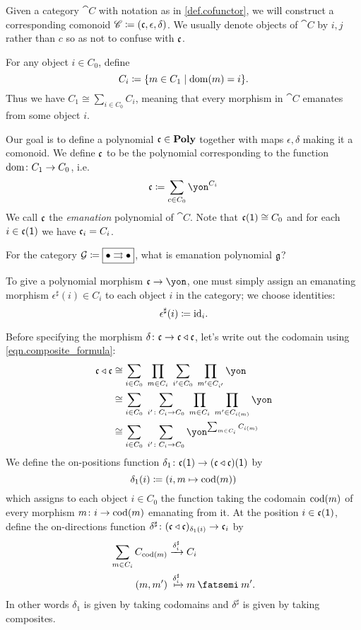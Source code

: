 \documentclass[DynamicalBook]{subfiles}
\begin{document}
Given a category $\cat{C}$ with notation as in \cref{def.cofunctor}, we will construct a corresponding comonoid $\mathscr{C}\coloneqq(\mathfrak{c},\epsilon,\delta)$. We usually denote objects of $\cat{C}$ by $i,j$ rather than $c$ so as not to confuse with $\mathfrak{c}$. 

For any object $i\in C_0$, define
\[C_i\coloneqq\{m\in C_1\mid\operatorname{dom}(m)=i\}.\]
Thus we have $C_1\cong\sum_{i\in C_0}C_i$, meaning that every morphism in $\cat{C}$ emanates from some object $i$.

Our goal is to define a polynomial $\mathfrak{c}\in\textbf{Poly}$ together with maps $\epsilon,\delta$ making it a comonoid. We define $\mathfrak{c}$ to be the polynomial corresponding to the function $\operatorname{dom}\colon C_1\to C_0$, i.e.\
\[
  \ema{c}\coloneqq \sum_{c\in C_0}\yon^{C_i}
\]
We call $\mathfrak{c}$ the \emph{emanation} polynomial of $\cat{C}$. Note that $\mathfrak{c}(\textsf{1})\cong C_0$ and for each $i\in\mathfrak{c}(\textsf{1})$ we have $\mathfrak{c}_i=C_i$.

\begin{exercise}
For the category $\mathcal{G}\coloneqq\fbox{$\bullet\rightrightarrows\bullet$}$, what is emanation polynomial $\mathfrak{g}$?
\end{exercise}

To give a polynomial morphism $\ema{c}\to\yon$, one must simply assign an emanating morphism $\epsilon^\sharp(i) \in C_i$ to each object $i$ in the category; we choose identities:
\[\epsilon^\sharp(i)\coloneqq\mathrm{id}_i.\]

Before specifying the morphism $\delta\colon\mathfrak{c}\to\mathfrak{c}\mathbin{\triangleleft}\mathfrak{c}$, let's write out the codomain using \cref{eqn.composite_formula}:
\begin{align*}
  \ema{c}\tri\ema{c}&\cong
  \sum_{i\in C_0}\;\prod_{m\in C_i}\;\sum_{i'\in C_0}\;\prod_{m'\in C_{i'}}\yon\\&\cong
  \sum_{i\in C_0}\;\sum_{i'\colon C_i\to C_0}\;\prod_{m\in C_i}\;\prod_{m'\in C_{i(m)}}\yon\\&\cong
  \sum_{i\in C_0}\;\sum_{i'\colon C_i\to C_0}\yon^{\sum_{m\in C_i}C_{i(m)}}
\end{align*}
We define the on-positions function $\delta_1\colon\mathfrak{c}(\textsf{1})\to(\mathfrak{c}\mathbin{\triangleleft}\mathfrak{c})(\textsf{1})$ by
\begin{equation}\label{eqn.emanation_cat_delta}
\delta_1(i)\coloneqq (i,m\mapsto\operatorname{cod}(m))
\end{equation}
which assigns to each object $i\in C_0$ the function taking the codomain $\operatorname{cod}(m)$ of every morphism $m\colon i\to\operatorname{cod}(m)$ emanating from it. At the position $i\in\mathfrak{c}(\textsf{1})$, define the on-directions function $\delta^\sharp\colon(\mathfrak{c}\mathbin{\triangleleft}\mathfrak{c})_{\delta_1(i)}\to\mathfrak{c}_i$ by
\begin{align}\nonumber
  \sum_{m\in C_i}C_{\cod(m)}&\To{\delta^\sharp_i}C_i\\\label{eqn.emanation_cat_delta_sharp}
  (m,m')&\Mapsto{\delta^\sharp_i} m\then m'.
\end{align}
In other words $\delta_1$ is given by taking codomains and $\delta^\sharp$ is given by taking composites.
\end{document}
